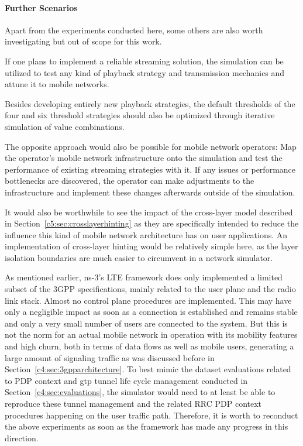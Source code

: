 \paragraph{Further Scenarios}

Apart from the experiments conducted here, some others are also worth investigating but out of scope for this work.

If one plans to implement a reliable streaming solution, the simulation can be utilized to test any kind of playback strategy and transmission mechanics and attune it to mobile networks. 

Besides developing entirely new playback strategies, the default thresholds of the four and six threshold strategies should also be optimized through iterative simulation of value combinations.

The opposite approach would also be possible for mobile network operators: Map the operator's mobile network infrastructure onto the simulation and test the performance of existing streaming strategies with it. If any issues or performance bottlenecks are discovered, the operator can make adjustments to the infrastructure and implement these changes afterwards outside of the simulation.

It would also be worthwhile to see the impact of the cross-layer model described in Section~\ref{c5:sec:crosslayerhinting} as they are specifically intended to reduce the influence this kind of mobile network architecture has on user applications. An implementation of cross-layer hinting would be relatively simple here, as the layer isolation boundaries are much easier to circumvent in a network simulator.

As mentioned earlier, ns-3's \gls{LTE} framework does only implemented a limited subset of the \gls{3GPP} specifications, mainly related to the user plane and the radio link stack. Almost no control plane procedures are implemented. This may have only a negligible impact as soon as a connection is established and remains stable and only a very small number of users are connected to the system. But this is not the norm for an actual mobile network in operation with its mobility features and high churn, both in terms of data flows as well as mobile users, generating a large amount of signaling traffic as was discussed before in Section~\ref{c4:sec:3gpparchitecture}. To best mimic the dataset evaluations related to \gls{PDP} context and \gls{gtp} tunnel life cycle management conducted in Section~\ref{c4:sec:evaluations}, the simulator would need to at least be able to reproduce these tunnel management and the related \gls{RRC} \gls{PDP} context procedures happening on the user traffic path. Therefore, it is worth to reconduct the above experiments as soon as the framework has made any progress in this direction.




